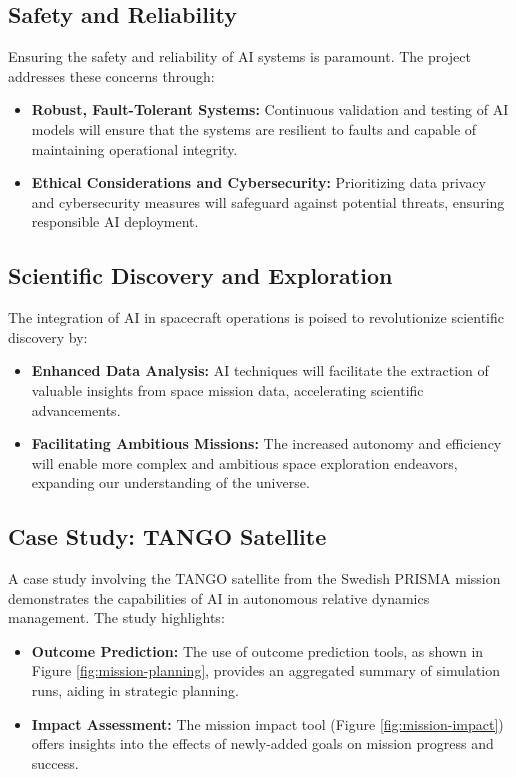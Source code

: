 \documentclass[a4paper,12pt]{article}
\begin{document}
\subsection{Safety and Reliability}

Ensuring the safety and reliability of AI systems is paramount. The project addresses these concerns through:

\begin{itemize}
    \item \textbf{Robust, Fault-Tolerant Systems:} Continuous validation and testing of AI models will ensure that the systems are resilient to faults and capable of maintaining operational integrity.
    \item \textbf{Ethical Considerations and Cybersecurity:} Prioritizing data privacy and cybersecurity measures will safeguard against potential threats, ensuring responsible AI deployment.
\end{itemize}

\subsection{Scientific Discovery and Exploration}

The integration of AI in spacecraft operations is poised to revolutionize scientific discovery by:

\begin{itemize}
    \item \textbf{Enhanced Data Analysis:} AI techniques will facilitate the extraction of valuable insights from space mission data, accelerating scientific advancements.
    \item \textbf{Facilitating Ambitious Missions:} The increased autonomy and efficiency will enable more complex and ambitious space exploration endeavors, expanding our understanding of the universe.
\end{itemize}

\subsection{Case Study: TANGO Satellite}

A case study involving the TANGO satellite from the Swedish PRISMA mission demonstrates the capabilities of AI in autonomous relative dynamics management. The study highlights:

\begin{itemize}
    \item \textbf{Outcome Prediction:} The use of outcome prediction tools, as shown in Figure \ref{fig:mission-planning}, provides an aggregated summary of simulation runs, aiding in strategic planning.
    \item \textbf{Impact Assessment:} The mission impact tool (Figure \ref{fig:mission-impact}) offers insights into the effects of newly-added goals on mission progress and success.
\end{itemize}
\end{document}
